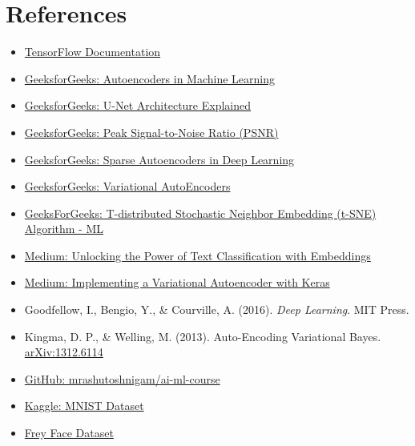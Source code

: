 \documentclass[12pt]{article}
\begin{document}
\section{References}
	\begin{itemize}
		\item \href{https://www.tensorflow.org}{TensorFlow Documentation}
		\item \href{https://www.geeksforgeeks.org/machine-learning/auto-encoders/}{GeeksforGeeks: Autoencoders in Machine Learning}
		\item 
		\href{https://www.geeksforgeeks.org/machine-learning/u-net-architecture-explained/}{GeeksforGeeks: U-Net Architecture Explained}
		\item 
		\href{https://www.geeksforgeeks.org/python/python-peak-signal-to-noise-ratio-psnr/}{GeeksforGeeks: Peak Signal-to-Noise Ratio (PSNR)}
		\item 
		\href{https://www.geeksforgeeks.org/deep-learning/sparse-autoencoders-in-deep-learning/}{GeeksforGeeks: Sparse Autoencoders in Deep Learning}
		\item 
		\href{https://www.geeksforgeeks.org/machine-learning/variational-autoencoders/}{GeeksforGeeks: Variational AutoEncoders}
		\item 
		\href{https://www.geeksforgeeks.org/machine-learning/ml-t-distributed-stochastic-neighbor-embedding-t-sne-algorithm/}{GeeksForGeeks: T-distributed Stochastic Neighbor Embedding (t-SNE) Algorithm - ML}
		\item
		\href{https://medium.com/@juanc.olamendy/unlocking-the-power-of-text-classification-with-embeddings-7bcbb5912790}{Medium: Unlocking the Power of Text Classification with Embeddings}
		\item \href{https://medium.com/h7w/implementing-a-variational-autoencoder-with-keras-e19d7140ad90}{Medium: Implementing a Variational Autoencoder with Keras}
		\item Goodfellow, I., Bengio, Y., \& Courville, A. (2016). \textit{Deep Learning}. MIT Press.
		\item Kingma, D. P., \& Welling, M. (2013). Auto-Encoding Variational Bayes. \href{https://arxiv.org/abs/1312.6114}{arXiv:1312.6114}
		\item \href{https://github.com/mrashutoshnigam/ai-ml-course/blob/main/DeepLearning_GeeksForGeeks/Programming_Assignment/q1%20copy.ipynb}{GitHub: mrashutoshnigam/ai-ml-course}
		\item \href{https://www.kaggle.com/datasets/zalando-research/mnist}{Kaggle: MNIST Dataset}
		\item \href{https://cs.nyu.edu/roweis/data/frey_rawface.mat}{Frey Face Dataset}
	\end{itemize}
\end{document}
